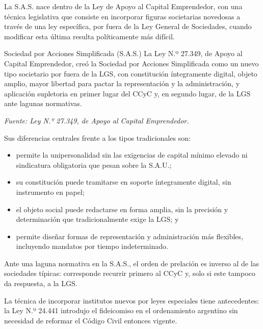 \documentclass[12pt,oneside]{book}
\begin{document}
La S.A.S. nace dentro de la Ley de Apoyo al Capital Emprendedor, con una técnica legislativa que consiste en incorporar figuras societarias novedosas a través de una ley específica, por fuera de la Ley General de Sociedades, cuando modificar esta última resulta políticamente más difícil.

\begin{definition}{Sociedad por Acciones Simplificada (S.A.S.)}
La Ley N.º 27.349, de Apoyo al Capital Emprendedor, creó la Sociedad por Acciones Simplificada como un nuevo tipo societario por fuera de la LGS, con constitución íntegramente digital, objeto amplio, mayor libertad para pactar la representación y la administración, y aplicación supletoria en primer lugar del CCyC y, en segundo lugar, de la LGS ante lagunas normativas.

\textit{Fuente: Ley N.º 27.349, de Apoyo al Capital Emprendedor.}
\end{definition}

Sus diferencias centrales frente a los tipos tradicionales son:

\begin{itemize}
    \item permite la unipersonalidad sin las exigencias de capital mínimo elevado ni sindicatura obligatoria que pesan sobre la S.A.U.;
    \item su constitución puede tramitarse en soporte íntegramente digital, sin instrumento en papel;
    \item el objeto social puede redactarse en forma amplia, sin la precisión y determinación que tradicionalmente exige la LGS; y
    \item permite diseñar formas de representación y administración más flexibles, incluyendo mandatos por tiempo indeterminado.
\end{itemize}

\begin{note}
Ante una laguna normativa en la S.A.S., el orden de prelación es inverso al de las sociedades típicas: corresponde recurrir primero al CCyC y, solo si este tampoco da respuesta, a la LGS.
\end{note}

La técnica de incorporar institutos nuevos por leyes especiales tiene antecedentes: la Ley N.º 24.441 introdujo el fideicomiso en el ordenamiento argentino sin necesidad de reformar el Código Civil entonces vigente.
\end{document}
